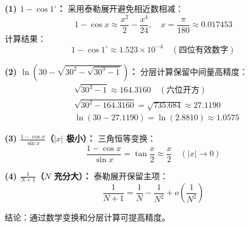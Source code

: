 \documentclass[UTF8]{ctexart}
\begin{document}
\begin{tcolorbox}[colback=blue!5!white,colframe=blue!75!black,title=问题9 优化计算方法]
	\textbf{(1) $ 1 - \cos1^\circ $：}
	采用泰勒展开避免相近数相减：
	$$
	1 - \cos x \approx \frac{x^2}{2} - \frac{x^4}{24},\quad x = \frac{\pi}{180} \approx 0.017453
	$$
	计算结果：
	$$
	1 - \cos1^\circ \approx 1.523 \times 10^{-4} \quad (\text{四位有效数字})
	$$
	
	\textbf{(2) $ \ln(30 - \sqrt{30^2 - \sqrt{30^3 -1}}) $：}
	分层计算保留中间量高精度：
	$$
	\begin{aligned}
	&\sqrt{30^3 -1} \approx 164.3160 \quad (\text{六位开方}) \\
	&\sqrt{30^2 - 164.3160} = \sqrt{735.684} \approx 27.1190 \\
	&\ln(30 - 27.1190) = \ln(2.8810) \approx 1.0575
	\end{aligned}
	$$
	
	\textbf{(3) $ \frac{1 - \cos x}{\sin x} $（$ |x| $ 极小）：}
	三角恒等变换：
	$$
	\frac{1 - \cos x}{\sin x} = \tan\frac{x}{2} \approx \frac{x}{2} \quad (|x| \to 0)
	$$
	
	\textbf{(4) $ \frac{1}{N+1} $（$ N $ 充分大）：}
	泰勒展开保留主项：
	$$
	\frac{1}{N+1} = \frac{1}{N} - \frac{1}{N^2} + o\left(\frac{1}{N^2}\right)
	$$
	
	结论：通过数学变换和分层计算可提高精度。
\end{tcolorbox}
\end{document}
